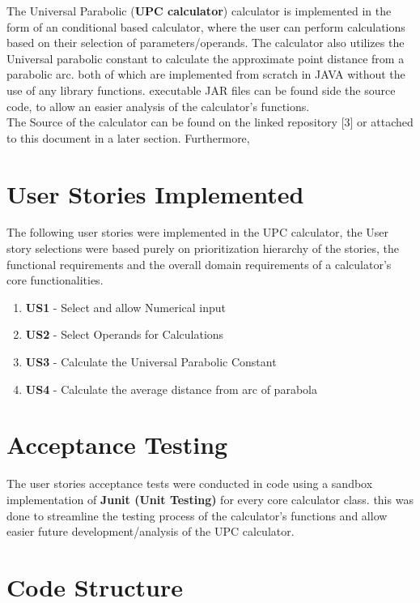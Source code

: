 \documentclass[12pt]{report}
\begin{document}
The  Universal Parabolic (\textbf{UPC calculator}) calculator is implemented in the form of an conditional based calculator, where the user can perform calculations based on their selection of parameters/operands. The calculator also utilizes the Universal parabolic constant to calculate the approximate point distance from a parabolic arc. both of which are implemented from scratch in JAVA without the use of any library functions. executable JAR files can be found side the source code, to allow an easier analysis of the calculator's functions. 
\hfill\break\\
\noindent The Source of the calculator can be found on the linked repository [3] or attached to this document in a later section. Furthermore, 

\section{User Stories Implemented}

The following user stories were implemented in the UPC calculator, the User story selections were based purely on prioritization hierarchy of the stories, the functional requirements and the overall domain requirements of a calculator's core functionalities.

\begin{enumerate}
    \item\textbf{ US1} - Select and allow Numerical input
    \item \textbf{US2} - Select Operands for Calculations
    \item \textbf{US3} - Calculate the Universal Parabolic Constant
    \item \textbf{US4} - Calculate the average distance from arc of parabola
\end{enumerate}

\section{Acceptance Testing}
The user stories acceptance tests were conducted in code using a sandbox implementation of \textbf{Junit (Unit Testing)} for every core calculator class. this was done to streamline the testing process of the calculator's functions and allow easier future development/analysis of the UPC calculator.   

\section{Code Structure}
\end{document}
